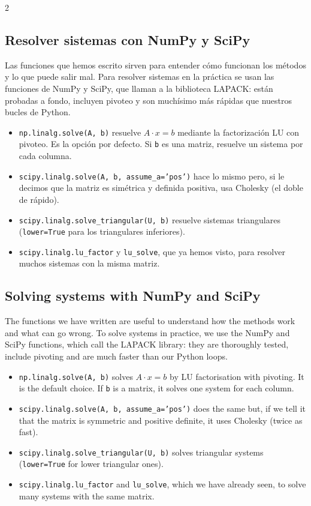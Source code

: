 \begin{paracol}{2}
\subsection{Resolver sistemas con NumPy y SciPy}\label{sec:sis_python}
Las funciones que hemos escrito sirven para entender cómo funcionan los métodos y lo que puede salir mal. Para resolver sistemas en la práctica se usan las funciones de NumPy y SciPy, que llaman a la biblioteca LAPACK: están probadas a fondo, incluyen pivoteo y son muchísimo más rápidas que nuestros bucles de Python.

\begin{itemize}
\item \texttt{np.linalg.solve(A, b)} resuelve $A\cdot x=b$ mediante la factorización LU con pivoteo. Es la opción por defecto. Si \texttt{b} es una matriz, resuelve un sistema por cada columna.
\item \texttt{scipy.linalg.solve(A, b, assume\_a='pos')} hace lo mismo pero, si le decimos que la matriz es simétrica y definida positiva, usa Cholesky (el doble de rápido).
\item \texttt{scipy.linalg.solve\_triangular(U, b)} resuelve sistemas triangulares (\texttt{lower=True} para los triangulares inferiores).
\item \texttt{scipy.linalg.lu\_factor} y \texttt{lu\_solve}, que ya hemos visto, para resolver muchos sistemas con la misma matriz.
\end{itemize}

\switchcolumn
\subsection{Solving systems with NumPy and SciPy}\label{sec:sis_python-2}
The functions we have written are useful to understand how the methods work and what can go wrong. To solve systems in practice, we use the NumPy and SciPy functions, which call the LAPACK library: they are thoroughly tested, include pivoting and are much faster than our Python loops.

\begin{itemize}
\item \texttt{np.linalg.solve(A, b)} solves $A\cdot x=b$ by LU factorisation with pivoting. It is the default choice. If \texttt{b} is a matrix, it solves one system for each column.
\item \texttt{scipy.linalg.solve(A, b, assume\_a='pos')} does the same but, if we tell it that the matrix is symmetric and positive definite, it uses Cholesky (twice as fast).
\item \texttt{scipy.linalg.solve\_triangular(U, b)} solves triangular systems (\texttt{lower=True} for lower triangular ones).
\item \texttt{scipy.linalg.lu\_factor} and \texttt{lu\_solve}, which we have already seen, to solve many systems with the same matrix.
\end{itemize}


\end{paracol}
